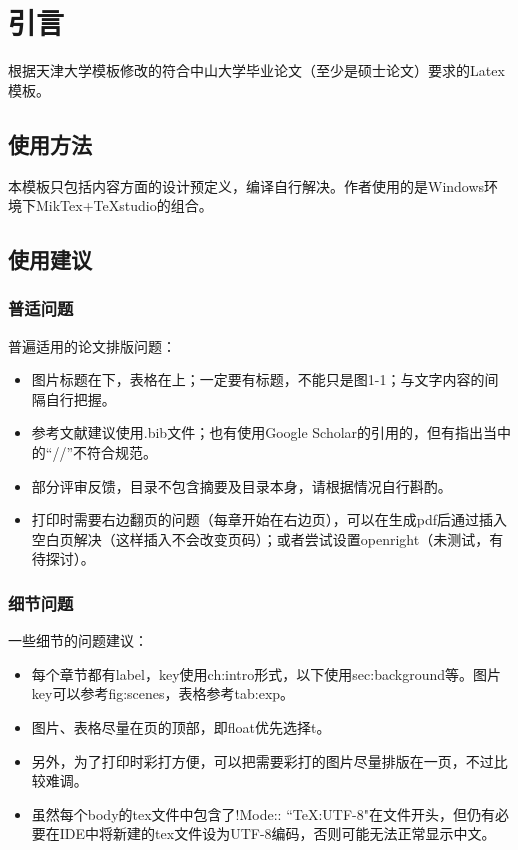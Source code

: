 

\chapter{引言}
\label{ch:intro}

根据天津大学模板修改的符合中山大学毕业论文（至少是硕士论文）要求的Latex模板。

\section{使用方法}
\label{sec:usage}

本模板只包括内容方面的设计预定义，编译自行解决。作者使用的是Windows环境下MikTex+TeXstudio的组合。

\section{使用建议}
\label{sec:tips}

\subsection{普适问题}
\label{subsec:common}

普遍适用的论文排版问题：

\begin{itemize}
\item 图片标题在下，表格在上；一定要有标题，不能只是图1-1；与文字内容的间隔自行把握。
\item 参考文献建议使用.bib文件；也有使用Google Scholar的引用的，但有指出当中的“//”不符合规范。
\item 部分评审反馈，目录不包含摘要及目录本身，请根据情况自行斟酌。
\item 打印时需要右边翻页的问题（每章开始在右边页），可以在生成pdf后通过插入空白页解决（这样插入不会改变页码）；或者尝试设置openright（未测试，有待探讨）。
\end{itemize}

\subsection{细节问题}
\label{subsec:specs}

一些细节的问题建议：
\begin{itemize}
\item 每个章节都有label，key使用ch:intro形式，以下使用sec:background等。图片key可以参考fig:scenes，表格参考tab:exp。
\item 图片、表格尽量在页的顶部，即float优先选择t。
\item 另外，为了打印时彩打方便，可以把需要彩打的图片尽量排版在一页，不过比较难调。
\item 虽然每个body的tex文件中包含了!Mode:: ``TeX:UTF-8"在文件开头，但仍有必要在IDE中将新建的tex文件设为UTF-8编码，否则可能无法正常显示中文。
\end{itemize}

